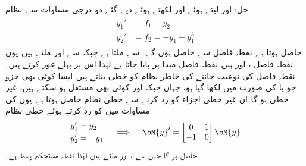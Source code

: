 حل: اور  لیتے ہوئے اور  لکھتے ہوئے دیے گئے دو درجی مساوات سے نظام
\begin{gather}
\begin{aligned}\label{مساوات_مثال_نظام_تفرقی_سے_نظام}
y_1'&=f_1=y_2\\
y_2'&=f_2=-y_1+y_1^3
\end{aligned}
\end{gather}
 حاصل ہوتا ہے۔نقطہ فاصل  سے حاصل ہوں گے۔ سے  ملتا ہے جبکہ  سے  اور  ملتے ہیں۔یوں نقطہ فاصل ،  اور  ہیں۔نقطہ فاصل  مبدا پر پایا جاتا ہے لہٰذا اس پر پہلے غور کرتے ہیں۔نقطہ فاصل کی نوعیت جاننے کی خاطر نظام کو خطی بناتے ہیں۔ایسا کوئی بھی جزو جو  یا  کی صورت میں لکھا گیا ہو، جہاں  جبکہ  اور  کوئی بھی  مستقل ہو سکتے ہیں، غیر خطی ہو گا۔ان غیر خطی اجزاء کو رد کرنے سے خطی نظام حاصل ہوتا ہے۔یوں  کی مساوات میں  کو رد کرتے ہوئے خطی نظام 
\begin{gather*}
\begin{aligned}
y_1'&=y_2\\
y_2'&=-y_1
\end{aligned}\quad \implies \quad
\begin{aligned}
\bM{y}'=\begin{bmatrix} 0&1\\-1&0 \end{bmatrix}\bM{y}
\end{aligned}
\end{gather*}
حاصل ہو گا جس سے  ،  اور  ملتے ہیں لہٰذا نقطہ  مستحکم وسط ہے۔

